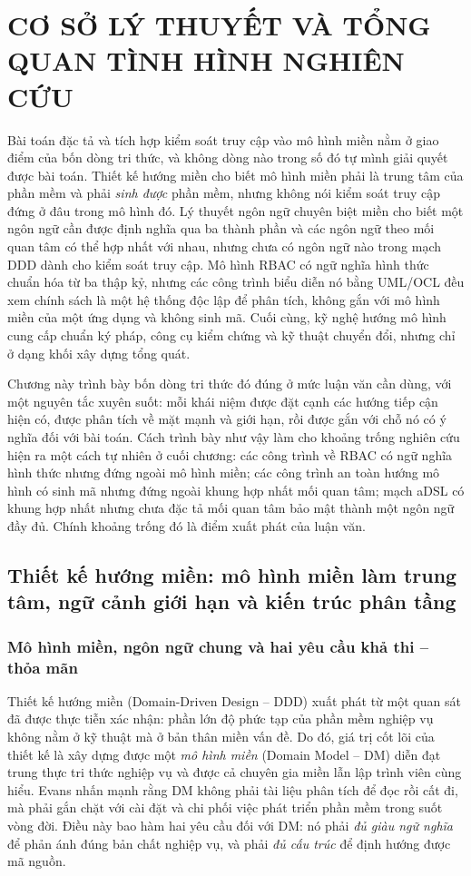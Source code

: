 \chapter{CƠ SỞ LÝ THUYẾT VÀ TỔNG QUAN TÌNH HÌNH NGHIÊN CỨU}
\label{ch:co-so-ly-thuyet}

Bài toán đặc tả và tích hợp kiểm soát truy cập vào mô hình miền nằm ở giao điểm của bốn dòng tri thức, và không dòng nào trong số đó tự mình giải quyết được bài toán. Thiết kế hướng miền cho biết mô hình miền phải là trung tâm của phần mềm và phải \emph{sinh được} phần mềm, nhưng không nói kiểm soát truy cập đứng ở đâu trong mô hình đó. Lý thuyết ngôn ngữ chuyên biệt miền cho biết một ngôn ngữ cần được định nghĩa qua ba thành phần và các ngôn ngữ theo mối quan tâm có thể hợp nhất với nhau, nhưng chưa có ngôn ngữ nào trong mạch DDD dành cho kiểm soát truy cập. Mô hình RBAC có ngữ nghĩa hình thức chuẩn hóa từ ba thập kỷ, nhưng các công trình biểu diễn nó bằng UML/OCL đều xem chính sách là một hệ thống độc lập để phân tích, không gắn với mô hình miền của một ứng dụng và không sinh mã. Cuối cùng, kỹ nghệ hướng mô hình cung cấp chuẩn ký pháp, công cụ kiểm chứng và kỹ thuật chuyển đổi, nhưng chỉ ở dạng khối xây dựng tổng quát.

Chương này trình bày bốn dòng tri thức đó đúng ở mức luận văn cần dùng, với một nguyên tắc xuyên suốt: mỗi khái niệm được đặt cạnh các hướng tiếp cận hiện có, được phân tích về mặt mạnh và giới hạn, rồi được gắn với chỗ nó có ý nghĩa đối với bài toán. Cách trình bày như vậy làm cho khoảng trống nghiên cứu hiện ra một cách tự nhiên ở cuối chương: các công trình về RBAC có ngữ nghĩa hình thức nhưng đứng ngoài mô hình miền; các công trình an toàn hướng mô hình có sinh mã nhưng đứng ngoài khung hợp nhất mối quan tâm; mạch aDSL có khung hợp nhất nhưng chưa đặc tả mối quan tâm bảo mật thành một ngôn ngữ đầy đủ. Chính khoảng trống đó là điểm xuất phát của luận văn.

\section{Thiết kế hướng miền: mô hình miền làm trung tâm, ngữ cảnh giới hạn và kiến trúc phân tầng}
\label{sec:ddd}

\subsection{Mô hình miền, ngôn ngữ chung và hai yêu cầu khả thi -- thỏa mãn}

Thiết kế hướng miền (Domain-Driven Design -- DDD) \cite{evans2003} xuất phát từ một quan sát đã được thực tiễn xác nhận: phần lớn độ phức tạp của phần mềm nghiệp vụ không nằm ở kỹ thuật mà ở bản thân miền vấn đề. Do đó, giá trị cốt lõi của thiết kế là xây dựng được một \emph{mô hình miền} (Domain Model -- DM) diễn đạt trung thực tri thức nghiệp vụ và được cả chuyên gia miền lẫn lập trình viên cùng hiểu. Evans nhấn mạnh rằng DM không phải tài liệu phân tích để đọc rồi cất đi, mà phải gắn chặt với cài đặt và chi phối việc phát triển phần mềm trong suốt vòng đời. Điều này bao hàm hai yêu cầu đối với DM: nó phải \emph{đủ giàu ngữ nghĩa} để phản ánh đúng bản chất nghiệp vụ, và phải \emph{đủ cấu trúc} để định hướng được mã nguồn.

